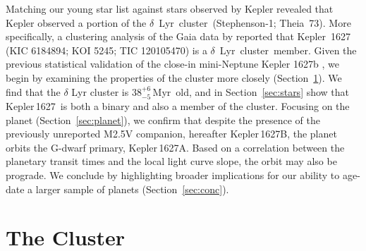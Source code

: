 \documentclass[12pt,modern,twocolumn,tighten]{aastex63}
\newcommand{\cn}{$\delta$\ Lyr\ cluster} %
\newcommand{\sn}{Kepler\,1627} %
\newcommand{\clusterage}{$38^{+6}_{-5}$\,Myr} %
\begin{document}
Matching our young star list against stars observed by Kepler revealed that
Kepler observed a portion of the \cn\ (Stephenson-1;
Theia~73).
More specifically, a clustering analysis of the Gaia
data by \citet{kounkel_untangling_2019}
reported that Kepler~1627 (KIC 6184894; KOI 5245; TIC 120105470) is a
\cn\ member.  Given the
previous statistical validation of the close-in mini-Neptune Kepler
1627b
\citep{2012ApJS..199...24T,morton_false_2016,thompson_planetary_2018},
we begin by examining the properties of the cluster more
closely (Section~\ref{sec:cluster}).  We find that the $\delta$ Lyr
cluster is \clusterage\ old, and 
in 
Section~\ref{sec:stars} show
that \sn\ is both a binary and also a member of the cluster.
Focusing on the planet (Section~\ref{sec:planet}), we confirm that despite the
presence of the previously unreported M2.5V companion, hereafter
Kepler\,1627B, the planet orbits the G-dwarf primary, Kepler\,1627A.  Based on a correlation between the
planetary transit times and the local light curve slope, the orbit
may also be prograde.  We conclude by highlighting broader
implications for our ability to age-date a larger sample of planets
(Section~\ref{sec:conc}).




\section{The Cluster}
\label{sec:cluster}
\end{document}
